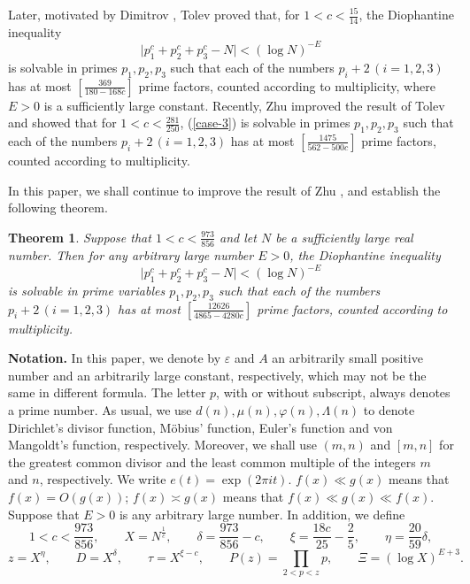 \documentclass[a4paper,oneside,11pt]{article}%
\newtheorem{theorem}{Theorem}[section]
\numberwithin{equation}{section}
\begin{document}
Later, motivated by Dimitrov \cite{Dimitrov-2017-1}, Tolev \cite{Tolev-2017} proved that, for $1<c<\frac{15}{14}$, the Diophantine inequality
\begin{equation}\label{case-3}
  \big|p_1^c+p_2^c+p_3^c-N\big|<(\log N)^{-E}
\end{equation}
is solvable in primes $p_1,p_2,p_3$ such that each of the numbers $p_i+2\,(i=1,2,3)$ has at most $[\frac{369}{180-168c}]$ prime factors, counted according to multiplicity, where $E>0$ is a sufficiently large constant. Recently, Zhu \cite{Zhu-2020} improved the result of Tolev \cite{Tolev-2017} and showed that for $1<c<\frac{281}{250}$, (\ref{case-3}) is solvable in primes $p_1,p_2,p_3$ such that each of the numbers $p_i+2\,(i=1,2,3)$ has at most $[\frac{1475}{562-500c}]$ prime factors, counted according to multiplicity.

In this paper, we shall continue to improve the result of Zhu \cite{Zhu-2020}, and establish the following theorem.

\begin{theorem}\label{Theorem-1}
  Suppose that $1<c<\frac{973}{856}$ and let $N$ be a sufficiently large real number. Then for any arbitrary large number
$E>0$, the Diophantine inequality
\begin{equation}\label{Thm-ineq}
   \big|p_1^c+p_2^c+p_3^c-N\big|<(\log N)^{-E}
\end{equation}
is solvable in prime variables $p_1,p_2,p_3$ such that each of the numbers $p_i+2\,(i=1,2,3)$ has at most
$[\frac{12626}{4865-4280c}]$ prime factors, counted according to multiplicity.
\end{theorem}






\noindent
\textbf{Notation.} In this paper, we denote by $\varepsilon$ and $A$ an arbitrarily small positive number and an arbitrarily large constant, respectively, which may not be the same in different formula. The letter
$p$, with or without subscript, always denotes a prime number. As usual, we use $d(n),\mu(n),\varphi(n),\Lambda(n)$ to
denote Dirichlet's divisor function, M\"{o}bius' function, Euler's function and von Mangoldt's function, respectively.
Moreover, we shall use $(m,n)$ and $[m,n]$ for the greatest common divisor and the least common multiple of the integers $m$ and $n$, respectively. We write $e(t)=\exp(2\pi it)$. $f(x)\ll g(x)$ means that $f(x)=O(g(x))$; $f(x)\asymp g(x)$ means that $f(x)\ll g(x)\ll f(x)$. Suppose that $E>0$ is any arbitrary large number. In addition, we define
\begin{equation*}
  1<c<\frac{973}{856},\qquad X=N^{\frac{1}{c}},\qquad \delta=\frac{973}{856}-c,\qquad \xi=\frac{18c}{25}-\frac{2}{5},\qquad
  \eta=\frac{20}{59}\delta,
\end{equation*}
\begin{equation*}
  z=X^\eta,\qquad D=X^\delta,\qquad \tau=X^{\xi-c},\qquad P(z)=\prod_{2<p<z}p, \qquad \Xi=(\log X)^{E+3}.
\end{equation*}
\end{document}
